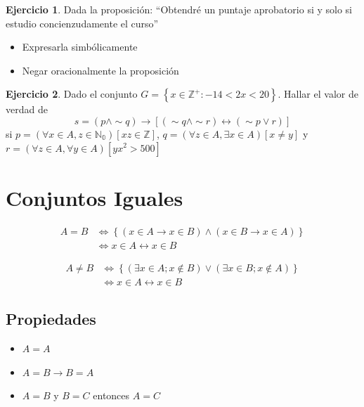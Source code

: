 \documentclass[
  16pt,
]{krantz}
\providecommand{\tightlist}{%
  \setlength{\itemsep}{0pt}\setlength{\parskip}{0pt}}
\theoremstyle{definition}
\theoremstyle{definition}
\theoremstyle{definition}
\newtheorem{exercise}{Ejercicio}[chapter]
\theoremstyle{definition}
\theoremstyle{remark}
\begin{document}
\begin{exercise}

Dada la proposición: ``Obtendré un puntaje aprobatorio si y solo si estudio concienzudamente el curso''

\begin{itemize}
\tightlist
\item
  Expresarla simbólicamente
\item
  Negar oracionalmente la proposición
\end{itemize}

\end{exercise}

\begin{exercise}
Dado el conjunto \(G=\left\{x\in\mathbb{Z}^+:-14<2x<20\right\}\). Hallar el valor de verdad de
\[
s=(p\wedge \sim q)\rightarrow[(\sim q\wedge \sim r)\leftrightarrow(\sim p\vee r)]
\]
si
\(p=(\forall x\in A, z\in \mathbb{N_0})[xz\in \mathbb{Z}]\), \(q=(\forall z\in A,\exists x \in A)[x\neq y]\) y \(r=(\forall z\in A, \forall y \in A)[yx^2>500]\)
\end{exercise}

\hypertarget{conjuntos-iguales}{%
\section{Conjuntos Iguales}\label{conjuntos-iguales}}

\[\begin{aligned}A=B&\Longleftrightarrow \left\{(x\in A\rightarrow x\in B)\wedge(x\in B\rightarrow x\in A)\right\}\\
&\Longleftrightarrow x\in A \leftrightarrow x\in B
\end{aligned}\]

\[\begin{aligned}A\neq B&\Longleftrightarrow \left\{(\exists x\in A; x\notin B)\vee(\exists x\in B; x\notin A)\right\}\\
&\Longleftrightarrow x\in A \leftrightarrow x\in B
\end{aligned}\]

\hypertarget{propiedades}{%
\subsection{Propiedades}\label{propiedades}}

\begin{itemize}
\tightlist
\item
  \(A=A\)
\item
  \(A=B\rightarrow B=A\)
\item
  \(A=B\) y \(B=C\) entonces \(A=C\)
\end{itemize}
\end{document}
